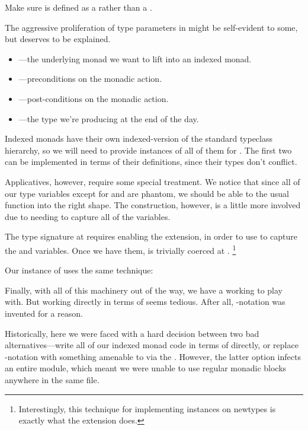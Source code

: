 \documentclass[book.tex]{subfiles}
\begin{document}

Make sure  is defined as a  rather than a .

The aggressive proliferation of type parameters in  might be self-evident
to some, but deserves to be explained.

\begin{itemize}
  \item{---the underlying monad we want to lift into an indexed monad.}
  \item{---preconditions on the monadic action.}
  \item{---post-conditions on the monadic action.}
  \item{---the type we're producing at the end of the day.}
\end{itemize}

Indexed monads have their own indexed-version of the standard typeclass
hierarchy, so we will need to provide instances of all of them for . The
first two can be implemented in terms of their  definitions, since
their types don't conflict.


Applicatives, however, require some special treatment. We notice that since all
of our type variables except for  and  are \gls{phantom}, we should
be able to  the usual  function into the right shape.
The construction, however, is a little more involved due to needing to capture
all of the variables.


The type signature at  requires enabling the 
extension, in order to use  to capture the  and
 variables. Once we have them, \hs{(<*>)} is trivially coerced at .
\footnote{Interestingly, this technique for implementing instances on newtypes
is exactly what the  extension does.}

Our instance of  uses the same technique:


Finally, with all of this machinery out of the way, we have a working
 to play with. But working directly in terms of  seems
tedious. After all, -notation was invented for a reason.

Historically, here we were faced with a hard decision between two bad
alternatives---write all of our indexed monad code in terms of 
directly, or replace -notation with something amenable to 
via the . However, the latter option infects an entire
module, which meant we were unable to use regular monadic  blocks
anywhere in the same file.
\end{document}
